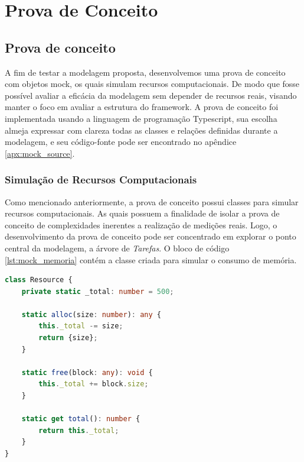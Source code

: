 \documentclass[12pt]{tcc}
\begin{document}
	\label{bibpage}
	\renewcommand\bibname{Referências}
	
	
	\label{bibfinalpage}

	\label{lastpage}



	\appendix








\chapter{Prova de Conceito}
\label{apx:mock}

\section{Prova de conceito}
\label{cap:prova_de_conceito}

A fim de testar a modelagem proposta, desenvolvemos uma prova de conceito com objetos mock, os quais simulam recursos computacionais.
De modo que fosse possível avaliar a eficácia da modelagem sem depender de recursos reais, visando manter o foco em avaliar a estrutura do framework.
A prova de conceito foi implementada usando a linguagem de programação Typescript, sua escolha almeja expressar com clareza todas as classes e relações definidas durante a modelagem, e seu código-fonte pode ser encontrado no apêndice \ref{apx:mock_source}.


\subsection{Simulação de Recursos Computacionais}
Como mencionado anteriormente, a prova de conceito possui classes para simular recursos computacionais.
As quais possuem a finalidade de isolar a prova de conceito de complexidades inerentes a realização de medições reais.
Logo, o desenvolvimento da prova de conceito pode ser concentrado em explorar o ponto central da modelagem, a árvore de \emph{Tarefas}.
O bloco de código \ref{lst:mock_memoria} contém a classe criada para simular o consumo de memória.

\begin{lstlisting}[label={lst:mock_memoria}, caption={Implementação da classe responsável por simular recursos de memória para a prova de conceito do framework.}, language=TypeScript]
class Resource {
	private static _total: number = 500;

	static alloc(size: number): any {
		this._total -= size;
		return {size};
	}

	static free(block: any): void {
		this._total += block.size;
	}

	static get total(): number {
		return this._total;
	}
}
\end{lstlisting}
\end{document}
